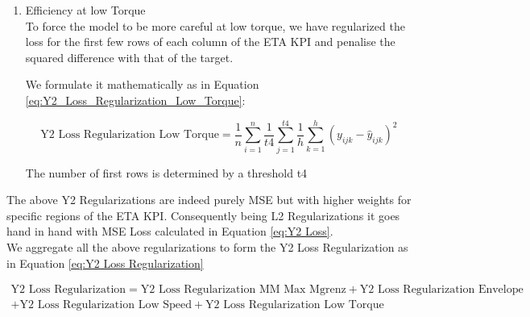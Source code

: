 \documentclass{report} %
\begin{document}
\begin{enumerate}
\item Efficiency at low Torque \\

To force the model to be more careful at low torque, we have regularized the loss for the first few rows of each column of the ETA \ac{KPI} and penalise the squared difference with that of the target.

We formulate it mathematically as in Equation \ref{eq:Y2_Loss_Regularization_Low_Torque}:

\begin{equation}
    \text{Y2 Loss Regularization Low Torque} = \frac{1}{n} \sum_{i=1}^{n} \frac{1}{t4} \sum_{j=1}^{t4} \frac{1}{h} \sum_{k=1}^{h} (y_{ijk} - \hat{y}_{ijk})^2
    \label{eq:Y2_Loss_Regularization_Low_Torque}
\end{equation}


\vspace{0.2cm} %

The number of first rows is determined by a threshold t4

\end{enumerate}

The above Y2 Regularizations are indeed purely \ac{MSE} but with higher weights for specific regions of the ETA \ac{KPI}.
Consequently being L2 Regularizations it goes hand in hand with \ac{MSE} Loss calculated in Equation \ref{eq:Y2 Loss}.\\

We aggregate all the above regularizations to form the Y2 Loss Regularization as in Equation \ref{eq:Y2 Loss Regularization}

\begin{equation}
    \begin{split}
\text{Y2 Loss Regularization} = \text{Y2 Loss Regularization MM Max Mgrenz} + \text{Y2 Loss Regularization Envelope} \\
    + \text{Y2 Loss Regularization Low Speed} + \text{Y2 Loss Regularization Low Torque}
    \end{split}
    \label{eq:Y2 Loss Regularization}
\end{equation}
\end{document}

